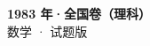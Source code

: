 \documentclass[zihao=-4, a4paper]{ctexart}
\begin{document}
\begin{center}
  {\Large\bfseries 1983 年·全国卷（理科）}\\[4pt]
  {\large 数学 · 试题版}
\end{center}
\medskip
{}

\end{document}
